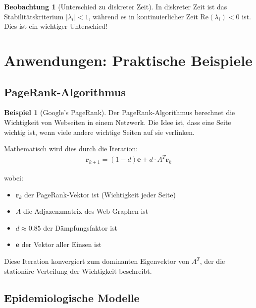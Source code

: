 ﻿\documentclass[a4paper,12pt]{report}
\theoremstyle{definition}
\newtheorem{beispiel}{Beispiel}
\newtheorem{beobachtung}{Beobachtung}
\begin{document}
	\begin{beobachtung}[Unterschied zu diskreter Zeit]
		In diskreter Zeit ist das Stabilitäts\-kriterium $|\lambda_i| < 1$, während es in kontinuierlicher Zeit $\text{Re}(\lambda_i) < 0$ ist. Dies ist ein wichtiger Unterschied!
	\end{beobachtung}
	
	\section{Anwendungen: Praktische Beispiele}
	
	\subsection{PageRank-Algorithmus}
	
	\begin{beispiel}[Google's PageRank]
		Der PageRank-Algorithmus berechnet die Wichtigkeit von Webseiten in einem Netzwerk. Die Idee ist, dass eine Seite wichtig ist, wenn viele andere wichtige Seiten auf sie verlinken.
		
		Mathematisch wird dies durch die Iteration:
		\begin{align}
			\mathbf{r}_{k+1} = (1-d) \mathbf{e} + d \cdot A^T \mathbf{r}_k
		\end{align}
		
		wobei:
		\begin{itemize}
			\item[-] $\mathbf{r}_k$ der PageRank-Vektor ist (Wichtigkeit jeder Seite)
			\item[-] $A$ die Adjazenzmatrix des Web-Graphen ist
			\item[-] $d \approx 0.85$ der Dämpfungsfaktor ist
			\item[-] $\mathbf{e}$ der Vektor aller Einsen ist
		\end{itemize}
		
		Diese Iteration konvergiert zum dominanten Eigenvektor von $A^T$, der die stationäre Verteilung der Wichtigkeit beschreibt.
	\end{beispiel}
	
	\subsection{Epidemiologische Modelle}
	
\end{document}
